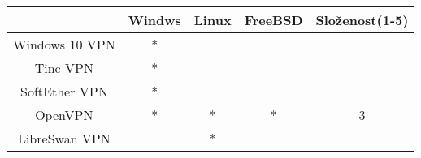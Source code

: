 \begin{center}
\begin{tabular}{c | c | c | c | c}
	 & \textbf{Windws} & \textbf{Linux} & \textbf{FreeBSD} &
         \textbf{Složenost(1-5)} \\
	 \hline

	Windows 10 VPN & * & & & \\
	\hline
        Tinc VPN & * & & & \\
	\hline
	SoftEther VPN & * & & & \\
	\hline
	OpenVPN & * & * & * & 3 \\
	\hline
	LibreSwan VPN & & *  & &  \\
\end{tabular}
\end{center}

